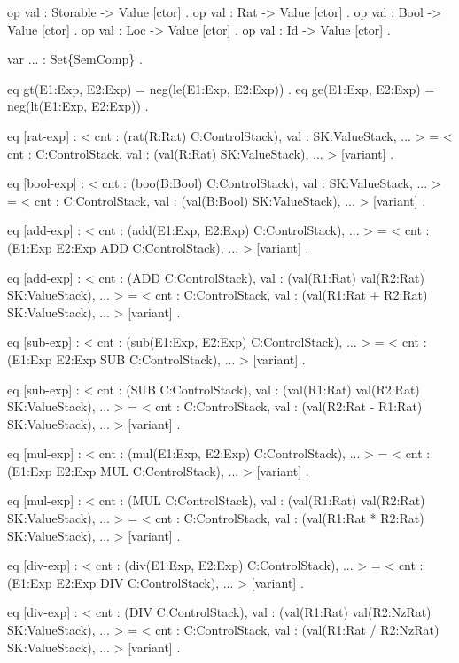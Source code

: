 \documentclass{llncs}%
\begin{document}
    op val : Storable -> Value [ctor] .
    op val : Rat -> Value [ctor] .
    op val : Bool -> Value [ctor] .
    op val : Loc -> Value [ctor] .
    op val : Id -> Value [ctor] .

    var ... : Set\{SemComp\} .

    eq gt(E1:Exp, E2:Exp) = neg(le(E1:Exp, E2:Exp)) .
    eq ge(E1:Exp, E2:Exp) = neg(lt(E1:Exp, E2:Exp)) .

    eq [rat-exp] :
        < cnt : (rat(R:Rat) C:ControlStack), val : SK:ValueStack, ... > 
     =
        < cnt : C:ControlStack,
          val : (val(R:Rat) SK:ValueStack), ... > [variant] .

    eq [bool-exp] :
        < cnt : (boo(B:Bool) C:ControlStack), val : SK:ValueStack, ... > 
     =
        < cnt : C:ControlStack,
          val : (val(B:Bool) SK:ValueStack), ... > [variant] .

    eq [add-exp] :
        < cnt : (add(E1:Exp, E2:Exp) C:ControlStack), ... > 
     =
        < cnt : (E1:Exp E2:Exp ADD C:ControlStack), ... > [variant] .

    eq [add-exp] :
        < cnt : (ADD C:ControlStack),
          val : (val(R1:Rat) val(R2:Rat) SK:ValueStack), ... > 
     =
        < cnt : C:ControlStack,
          val : (val(R1:Rat + R2:Rat) SK:ValueStack), ... > [variant] .

    eq [sub-exp] :
        < cnt : (sub(E1:Exp, E2:Exp) C:ControlStack), ... > 
     =
        < cnt : (E1:Exp E2:Exp SUB C:ControlStack), ... > [variant] .

    eq [sub-exp] :
        < cnt : (SUB C:ControlStack),
          val : (val(R1:Rat) val(R2:Rat) SK:ValueStack), ... > 
     =
        < cnt : C:ControlStack,
          val : (val(R2:Rat - R1:Rat) SK:ValueStack), ... > [variant] .

    eq [mul-exp] :
        < cnt : (mul(E1:Exp, E2:Exp) C:ControlStack), ... > 
     =
        < cnt : (E1:Exp E2:Exp MUL C:ControlStack), ... > [variant] .

    eq [mul-exp] :
        < cnt : (MUL C:ControlStack),
          val : (val(R1:Rat) val(R2:Rat) SK:ValueStack), ... > 
     =
        < cnt : C:ControlStack,
          val : (val(R1:Rat * R2:Rat) SK:ValueStack), ... > [variant] .

    eq [div-exp] :
        < cnt : (div(E1:Exp, E2:Exp) C:ControlStack), ... > 
     =
        < cnt : (E1:Exp E2:Exp DIV C:ControlStack), ... > [variant] .

    eq [div-exp] :
        < cnt : (DIV C:ControlStack),
          val : (val(R1:Rat) val(R2:NzRat) SK:ValueStack), ... > 
     =
        < cnt : C:ControlStack,
          val : (val(R1:Rat / R2:NzRat) SK:ValueStack), ... > [variant] .
\end{document}
